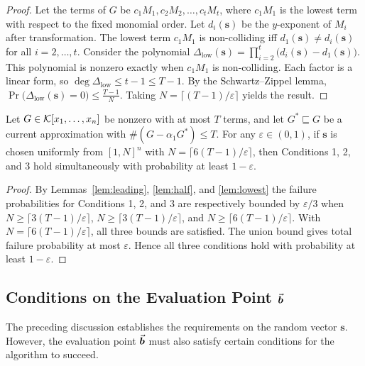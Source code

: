 \documentclass{article}
\numberwithin{equation}{section}
\begin{document}
\begin{proof}
Let the terms of $G$ be $c_1 M_1, c_2 M_2, \dots, c_t M_t$, where $c_1 M_1$ is the lowest term with respect to the fixed monomial order. Let $d_i(\mathbf{s})$ be the $y$-exponent of $M_i$ after transformation. The lowest term $c_1 M_1$ is non-colliding iff $d_1(\mathbf{s}) \neq d_i(\mathbf{s})$ for all $i = 2, \dots, t$. Consider the polynomial
%
$\Delta_{\text{low}}(\mathbf{s}) = \prod_{i=2}^t \bigl(d_i(\mathbf{s}) - d_1(\mathbf{s})\bigr).$
%
This polynomial is nonzero exactly when $c_1 M_1$ is non-colliding. Each factor is a linear form, so $\deg \Delta_{\text{low}} \le t-1 \le T-1$. By the Schwartz--Zippel lemma,
%
$\Pr\bigl(\Delta_{\text{low}}(\mathbf{s}) = 0\bigr) \le \frac{T-1}{N}.$
%
Taking $N = \lceil (T-1)/\varepsilon \rceil$ yields the result.
\end{proof}

\begin{theorem}\label{thm:s-prob}
Let $G \in {\mathcal{K}}[x_1, \dots, x_n]$ be nonzero with at most $T$ terms, and let $G^* \sqsubseteq G$ be a current approximation with $\#(G - \alpha_1 G^*) \le T$. For any $\varepsilon \in (0,1)$, if $\mathbf{s}$ is chosen uniformly from $[1, N]^n$ with $N = \lceil 6(T-1)/\varepsilon \rceil$, then Conditions 1, 2, and 3 hold simultaneously with probability at least $1 - \varepsilon$.
\end{theorem}

\begin{proof}
By Lemmas~\ref{lem:leading}, \ref{lem:half}, and \ref{lem:lowest} the failure probabilities for Conditions 1, 2, and 3 are respectively bounded by $\varepsilon/3$ when $N \ge \lceil 3(T-1)/\varepsilon\rceil$, $N \ge \lceil 3(T-1)/\varepsilon\rceil$, and $N \ge \lceil 6(T-1)/\varepsilon\rceil$. With $N = \lceil 6(T-1)/\varepsilon \rceil$, all three bounds are satisfied. The union bound gives total failure probability at most $\varepsilon$. Hence all three conditions hold with probability at least $1 - \varepsilon$.
\end{proof}


\subsection{Conditions on the Evaluation Point $\vec{\boldsymbol{b}}$}

The preceding discussion establishes the requirements on the random vector $\mathbf{s}$. However, the evaluation point $\vec{\boldsymbol{b}}$ must also satisfy certain conditions for the algorithm to succeed.
\end{document}
